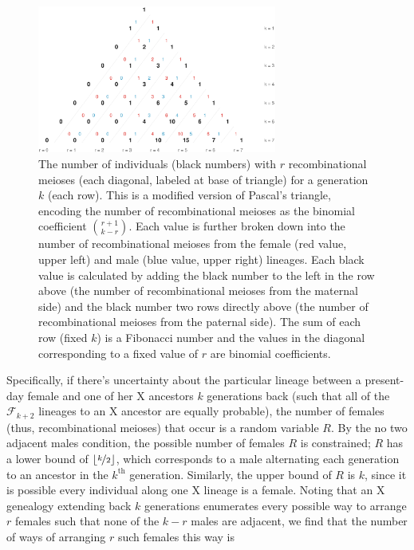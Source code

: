 \documentclass[11pt]{article}
\begin{document}
\begin{figure}[!ht]
  \centering
  \includegraphics[width=0.7\textwidth]{images/bifib}

  \caption{The number of individuals (black numbers) with $r$ recombinational
    meioses (each diagonal, labeled at base of triangle) for a generation $k$
    (each row). This is a modified version of Pascal's triangle, encoding the
    number of recombinational meioses as the binomial coefficient ${r + 1
    \choose k - r}$.  Each value is further broken down into the number of
    recombinational meioses from the female (red value, upper left) and male
    (blue value, upper right) lineages. Each black value is calculated by adding
    the black number to the left in the row above (the number of
    recombinational meioses from the maternal side) and the black number two
    rows directly above (the number of recombinational meioses from the
  paternal side). The sum of each row (fixed $k$) is a Fibonacci number and the
values in the diagonal corresponding to a fixed value of $r$ are binomial
coefficients.}

  \label{fig:pascals-bifib}

\end{figure}

Specifically, if there's uncertainty about the particular lineage between a
present-day female and one of her X ancestors $k$ generations back (such that
all of the $\mathcal{F}_{k+2}$ lineages to an X ancestor are equally probable),
the number of females (thus, recombinational meioses) that occur is a random
variable $R$. By the no two adjacent males condition, the possible number of
females $R$ is constrained; $R$ has a lower bound of $\lfloor \nicefrac{k}{2}
\rfloor$, which corresponds to a male alternating each generation to an
ancestor in the $k^\text{th}$ generation. Similarly, the upper bound of $R$ is
$k$, since it is possible every individual along one X lineage is a female.
Noting that an X genealogy extending back $k$ generations enumerates every
possible way to arrange $r$ females such that none of the $k-r$ males are
adjacent, we find that the number of ways of arranging $r$ such females this
way is
\end{document}
